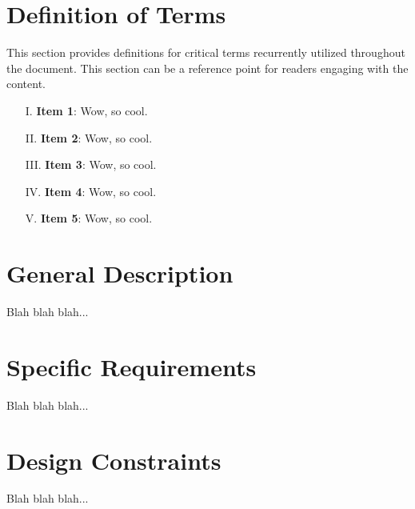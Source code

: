 \documentclass{article}
\begin{document}
\section{Definition of Terms}
This section provides definitions for critical terms recurrently utilized throughout the document. This section can be a reference point for readers engaging with the content.

\begin{enumerate}
    \item[I.] \textbf{Item 1}: Wow, so cool.
    \item[II.] \textbf{Item 2}: Wow, so cool.
    \item[III.] \textbf{Item 3}: Wow, so cool.
    \item[IV.] \textbf{Item 4}: Wow, so cool.
    \item[V.] \textbf{Item 5}: Wow, so cool.
\end{enumerate}

\section{General Description}
Blah blah blah...

\section{Specific Requirements}
Blah blah blah...

\section{Design Constraints}
Blah blah blah...

\newpage

\printbibliography

{\parindent0pt}
\end{document}
